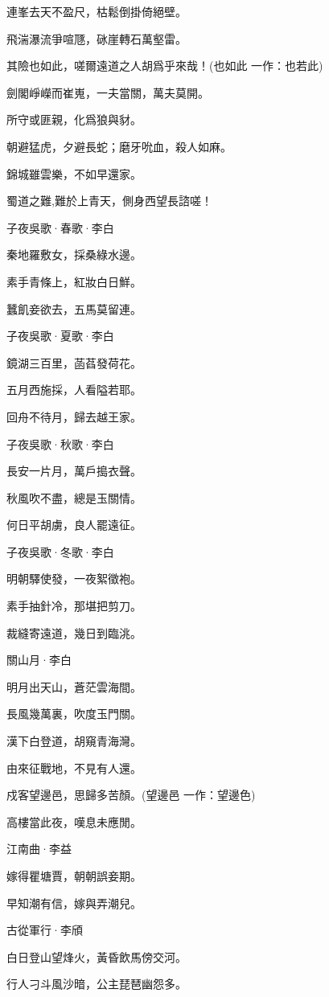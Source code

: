 \documentclass[12pt,a4paper]{ctexbook}
\begin{document}
連峯去天不盈尺，枯鬆倒掛倚絕壁。\par
飛湍瀑流爭喧豗，砯崖轉石萬壑雷。\par
其險也如此，嗟爾遠道之人胡爲乎來哉！(也如此 一作：也若此)\par
劍閣崢嶸而崔嵬，一夫當關，萬夫莫開。\par
所守或匪親，化爲狼與豺。\par
朝避猛虎，夕避長蛇；磨牙吮血，殺人如麻。\par
錦城雖雲樂，不如早還家。\par
蜀道之難,難於上青天，側身西望長諮嗟！\par
子夜吳歌·春歌·李白\par
秦地羅敷女，採桑綠水邊。\par
素手青條上，紅妝白日鮮。\par
蠶飢妾欲去，五馬莫留連。\par
子夜吳歌·夏歌·李白\par
鏡湖三百里，菡萏發荷花。\par
五月西施採，人看隘若耶。\par
回舟不待月，歸去越王家。\par
子夜吳歌·秋歌·李白\par
長安一片月，萬戶搗衣聲。\par
秋風吹不盡，總是玉關情。\par
何日平胡虜，良人罷遠征。\par
子夜吳歌·冬歌·李白\par
明朝驛使發，一夜絮徵袍。\par
素手抽針冷，那堪把剪刀。\par
裁縫寄遠道，幾日到臨洮。\par
關山月·李白\par
明月出天山，蒼茫雲海間。\par
長風幾萬裏，吹度玉門關。\par
漢下白登道，胡窺青海灣。\par
由來征戰地，不見有人還。\par
戍客望邊邑，思歸多苦顏。(望邊邑 一作：望邊色)\par
高樓當此夜，嘆息未應閒。\par
江南曲·李益\par
嫁得瞿塘賈，朝朝誤妾期。\par
早知潮有信，嫁與弄潮兒。\par
古從軍行·李頎\par
白日登山望烽火，黃昏飲馬傍交河。\par
行人刁斗風沙暗，公主琵琶幽怨多。\par
\end{document}

